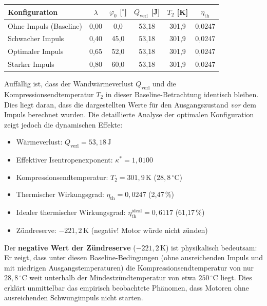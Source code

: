 ﻿\documentclass[a4paper,12pt]{article}
\begin{document}
\begin{center}
\begin{tabular}{lccccc}
\toprule
Konfiguration & $\lambda$ & $\varphi_0$ [$^\circ$] & $Q_\text{verl}$ [J] & $T_2$ [K] & $\eta_\text{th}$ \\
\midrule
Ohne Impuls (Baseline) & 0{,}00 & 0{,}0 & 53{,}18 & 301{,}9 & 0{,}0247 \\
Schwacher Impuls & 0{,}40 & 45{,}0 & 53{,}18 & 301{,}9 & 0{,}0247 \\
Optimaler Impuls & 0{,}65 & 52{,}0 & 53{,}18 & 301{,}9 & 0{,}0247 \\
Starker Impuls & 0{,}80 & 60{,}0 & 53{,}18 & 301{,}9 & 0{,}0247 \\
\bottomrule
\end{tabular}
\end{center}

Auffällig ist, dass der Wandwärmeverlust $Q_\text{verl}$ und die Kompressionsendtemperatur
$T_2$ in dieser Baseline-Betrachtung identisch bleiben. Dies liegt daran,
dass die dargestellten Werte für den Ausgangszustand \textit{vor} dem Impuls
berechnet wurden. Die detaillierte Analyse der optimalen Konfiguration zeigt
jedoch die dynamischen Effekte:

\begin{itemize}
  \item Wärmeverlust: $Q_\text{verl} = 53{,}18\,\text{J}$
  \item Effektiver Isentropenexponent: $\kappa^* = 1{,}0100$
  \item Kompressionsendtemperatur: $T_2 = 301{,}9\,\text{K}$ ($28{,}8\,^\circ\text{C}$)
  \item Thermischer Wirkungsgrad: $\eta_\text{th} = 0{,}0247$ (2{,}47\,\%)
  \item Idealer thermischer Wirkungsgrad: $\eta_\text{th}^\text{ideal} = 0{,}6117$ (61{,}17\,\%)
  \item Zündreserve: $-221{,}2\,\text{K}$ (negativ! Motor würde nicht zünden)
\end{itemize}

Der\textbf{ negative Wert der Zündreserve} ($-221{,}2\,\text{K}$) ist physikalisch
bedeutsam: Er zeigt, dass unter diesen Baseline-Bedingungen (ohne ausreichenden
Impuls und mit niedrigen Ausgangstemperaturen) die Kompressionsendtemperatur
von nur $28{,}8\,^\circ\text{C}$ weit unterhalb der Mindestzündtemperatur
von etwa $250\,^\circ\text{C}$ liegt. Dies erklärt unmittelbar das empirisch
beobachtete Phänomen, dass Motoren ohne ausreichenden Schwungimpuls nicht
starten.
\end{document}
